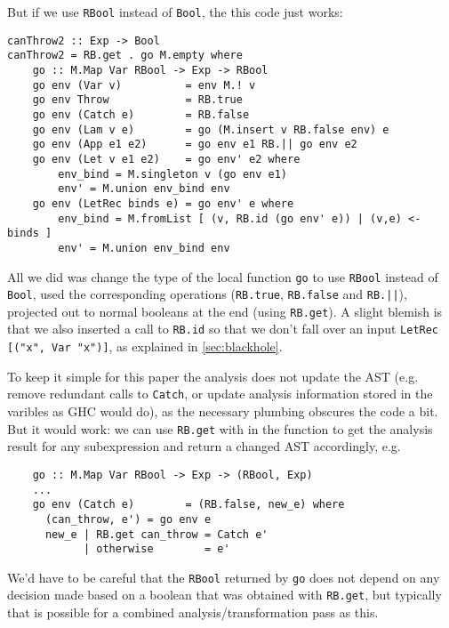 \documentclass[manuscript,screen,acmsmall]{acmart}
\begin{document}
But if we use \verb|RBool| instead of \verb|Bool|, the this code just works:
\begin{verbatim}
canThrow2 :: Exp -> Bool
canThrow2 = RB.get . go M.empty where
    go :: M.Map Var RBool -> Exp -> RBool
    go env (Var v)          = env M.! v
    go env Throw            = RB.true
    go env (Catch e)        = RB.false
    go env (Lam v e)        = go (M.insert v RB.false env) e
    go env (App e1 e2)      = go env e1 RB.|| go env e2
    go env (Let v e1 e2)    = go env' e2 where
        env_bind = M.singleton v (go env e1)
        env' = M.union env_bind env
    go env (LetRec binds e) = go env' e where
        env_bind = M.fromList [ (v, RB.id (go env' e)) | (v,e) <- binds ]
        env' = M.union env_bind env
\end{verbatim}
All we did was change the type of the local function \verb|go| to use \verb|RBool| instead of \verb|Bool|, used the corresponding operations (\verb|RB.true|, \verb|RB.false| and \verb+RB.||+), projected out to normal booleans at the end (using \verb|RB.get|). A slight blemish is that we also inserted a call to \verb|RB.id| so that we don't fall over an input \verb|LetRec [("x", Var "x")]|, as explained in \cref{sec:blackhole}.

To keep it simple for this paper the analysis does not update the AST (e.g. remove redundant calls to \verb|Catch|, or update analysis information stored in the varibles as GHC would do), as the necessary plumbing obscures the code a bit. But it would work: we can use \verb|RB.get|  with in the function to get the analysis result for any subexpression and return a changed AST accordingly, e.g.
\begin{verbatim}
    go :: M.Map Var RBool -> Exp -> (RBool, Exp)
    ...
    go env (Catch e)        = (RB.false, new_e) where
      (can_throw, e') = go env e
      new_e | RB.get can_throw = Catch e'
            | otherwise        = e'
\end{verbatim}
We'd have to be careful that the \verb|RBool| returned by \verb|go| does not depend on any decision made based on a boolean that was obtained with \verb|RB.get|, but typically that is possible for a combined analysis/transformation pass as this.
\end{document}
